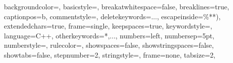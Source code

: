 \newcommand{\LbLll}{\Lambda_b \to \Lambda \ell \bar{\ell}}
\newcommand{\LbLmumu}{\Lambda_b \to \Lambda \mu^+\mu^-}
\newcommand{\LbLee}{\Lambda_b \to \Lambda e^+e^-}

\newcommand{\bppijpsi}{B^+\to J/\psi \pi^+}
\newcommand{\jpsimumu}{J/\psi \to \mu^+\mu^-}

\usepackage{xcolor}
\usepackage{listings}
\usepackage{tikz}


\lstset
{
    backgroundcolor=\color{white},   %
    basicstyle=\tiny\ttfamily,       %
    breakatwhitespace=false,         %
    breaklines=true,                 %
    captionpos=b,                    %
    commentstyle=\color{mygreen},    %
    deletekeywords={...},            %
    escapeinside={\%*}{*)},          %
    extendedchars=true,              %
    frame=single,	                   %
    keepspaces=true,                 %
    keywordstyle=\color{blue},       %
    language=C++,                    %
    otherkeywords={*,...},           %
    numbers=left,                    %
    numbersep=5pt,                   %
    numberstyle=\tiny\color{mygray}, %
    rulecolor=\color{black},         %
    showspaces=false,                %
    showstringspaces=false,          %
    showtabs=false,                  %
    stepnumber=2,                    %
    stringstyle=\color{mymauve},     %
    frame=none,
    tabsize=2,	                   %
}
\newcommand\tikzwidth{2}
\newcommand\tikzwidthwide{4}
\newcommand\tikzheight{0.25}
\newcommand\tikzdec{0.9}

